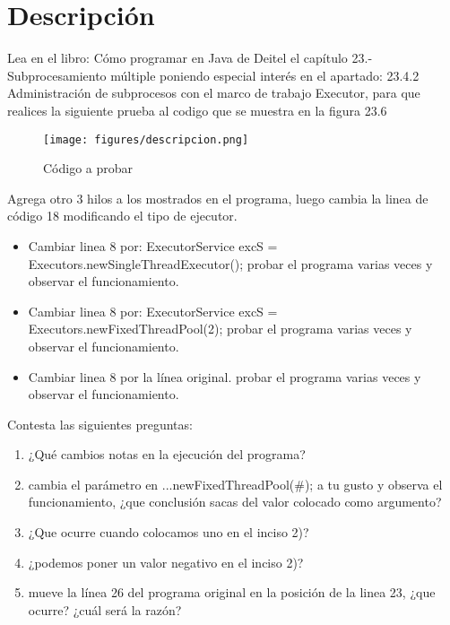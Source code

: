\documentclass[12pt]{article}
\author{Pablo Vargas Bermúdez}
\begin{document}
\pagestyle{empty}



\section*{Descripción}
Lea en el libro: Cómo programar en Java de Deitel el capítulo 23.-
Subprocesamiento múltiple poniendo especial interés en el apartado:
23.4.2 Administración de subprocesos con el marco de trabajo Executor,
para que realices la siguiente prueba al codigo que se muestra en la
figura 23.6

\begin{figure}[ht!]
  \centering
  \texttt{[image: figures/descripcion.png]}
  \caption{Código a probar}
\end{figure}


Agrega otro 3 hilos a los mostrados en el programa, luego cambia la
linea de código 18 modificando el tipo de ejecutor.


\begin{itemize}
\item Cambiar linea 8 por: ExecutorService excS =
  Executors.newSingleThreadExecutor(); probar el programa varias veces
  y observar el funcionamiento.
\item Cambiar linea 8 por: ExecutorService excS =
  Executors.newFixedThreadPool(2); probar el programa varias veces y
  observar el funcionamiento.
\item Cambiar linea 8 por la línea original.  probar el programa
  varias veces y observar el funcionamiento.
\end{itemize}

Contesta las siguientes preguntas:

\begin{enumerate}
\item ¿Qué cambios notas en la ejecución del programa?
\item cambia el parámetro en ...newFixedThreadPool(\#); a tu gusto y
  observa el funcionamiento, ¿que conclusión sacas del valor colocado
  como argumento?
\item ¿Que ocurre cuando colocamos uno en el inciso 2)?
\item ¿podemos poner un valor negativo en el inciso 2)?
\item mueve la línea 26 del programa original en la posición de la
  linea 23, ¿que ocurre?  ¿cuál será la razón?
\end{enumerate}
\end{document}
